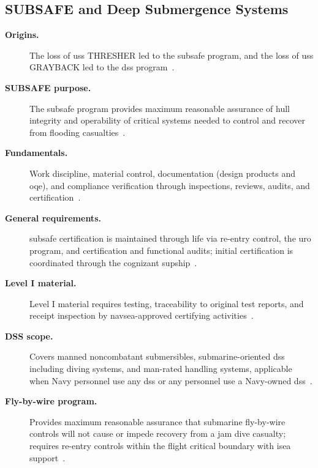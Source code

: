 \documentclass[../main.tex]{subfiles}
\begin{document}
\subsection{SUBSAFE and Deep Submergence Systems}
\begin{description}
  \item[\textbf{Origins.}] The loss of \ac{uss} THRESHER led to the \ac{subsafe} program, and the loss of \ac{uss} GRAYBACK led to the \ac{dss} program~\autocite{edo-4-1-5-waterfront-work-control-2025}.
  \item[\textbf{SUBSAFE purpose.}] The \ac{subsafe} program provides maximum reasonable assurance of hull integrity and operability of critical systems needed to control and recover from flooding casualties~\autocite{edo-4-1-5-waterfront-work-control-2025}.
  \item[\textbf{Fundamentals.}] Work discipline, material control, documentation (design products and \ac{oqe}), and compliance verification through inspections, reviews, audits, and certification~\autocite{edo-4-1-5-waterfront-work-control-2025}.
  \item[\textbf{General requirements.}] \ac{subsafe} certification is maintained through life via re-entry control, the \ac{uro} program, and certification and functional audits; initial certification is coordinated through the cognizant \ac{supship}~\autocite{edo-4-1-5-waterfront-work-control-2025}.
  \item[\textbf{Level I material.}] Level I material requires testing, traceability to original test reports, and receipt inspection by \ac{navsea}-approved certifying activities~\autocite{edo-4-1-5-waterfront-work-control-2025}.
  \item[\textbf{DSS scope.}] Covers manned noncombatant submersibles, submarine-oriented \ac{dss} including diving systems, and man-rated handling systems, applicable when Navy personnel use any \ac{dss} or any personnel use a Navy-owned \ac{dss}~\autocite{edo-4-1-5-waterfront-work-control-2025}.
  \item[\textbf{Fly-by-wire program.}] Provides maximum reasonable assurance that submarine fly-by-wire controls will not cause or impede recovery from a jam dive casualty; requires re-entry controls within the flight critical boundary with \ac{isea} support~\autocite{edo-4-1-5-waterfront-work-control-2025}.
\end{description}
\end{document}
